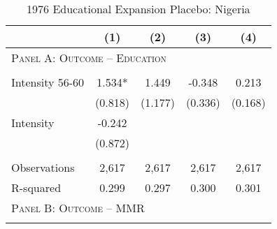 \begin{subtables}\begin{table}[htpb!]\begin{center}\caption{1976 Educational Expansion Placebo: Nigeria}\label{MMRtab:NigeriaPlacebo}\begin{tabular}{p{5cm}cccc}\toprule&(1)&(2)&(3)&(4)\\ \midrule\multicolumn{5}{l}{\textsc{Panel A: Outcome -- Education}}\\\begin{footnotesize}\end{footnotesize}&\begin{footnotesize}\end{footnotesize}&\begin{footnotesize}\end{footnotesize}&\begin{footnotesize}\end{footnotesize}\\ 
Intensity 56-60&1.534*&1.449&-0.348&0.213\\ 
               &(0.818)&(1.177)&(0.336)&(0.168)\\ 
Intensity      &-0.242&&&\\ 
               &(0.872)&&&\\ 
\begin{footnotesize}\end{footnotesize}&\begin{footnotesize}\end{footnotesize}&\begin{footnotesize}\end{footnotesize}&\begin{footnotesize}\end{footnotesize}\\ 
Observations&2,617&2,617&2,617&2,617\\ 
R-squared&0.299&0.297&0.300&0.301\\ \midrule 
\multicolumn{5}{l}{\textsc{Panel B: Outcome -- MMR}}\\ 
\begin{footnotesize}\end{footnotesize}&\begin{footnotesize}\end{footnotesize}&\begin{footnotesize}\end{footnotesize}&\begin{footnotesize}\end{footnotesize}\\ 

\end{tabular}
\end{center}
\end{table}
\end{subtables}
